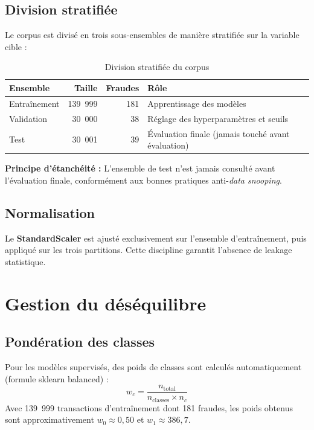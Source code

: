 \documentclass[12pt,a4paper,twoside]{report}
\begin{document}
\subsection{Division stratifiée}

Le corpus est divisé en trois sous-ensembles de manière stratifiée sur la variable cible :

\begin{table}[H]
\centering
\caption{Division stratifiée du corpus}
\label{tab:splits}
\begin{tabular}{lrrl}
\toprule
\textbf{Ensemble} & \textbf{Taille} & \textbf{Fraudes} & \textbf{Rôle} \\
\midrule
Entraînement  & 139~999 & 181 & Apprentissage des modèles \\
Validation    & 30~000  & 38  & Réglage des hyperparamètres et seuils \\
Test          & 30~001  & 39  & Évaluation finale (jamais touché avant évaluation) \\
\bottomrule
\end{tabular}
\end{table}

\textbf{Principe d'étanchéité :} L'ensemble de test n'est jamais consulté avant l'évaluation finale, conformément aux bonnes pratiques anti-\textit{data snooping}.

\subsection{Normalisation}

Le \textbf{StandardScaler} est ajusté exclusivement sur l'ensemble d'entraînement, puis appliqué sur les trois partitions. Cette discipline garantit l'absence de leakage statistique.

\section{Gestion du déséquilibre}

\subsection{Pondération des classes}

Pour les modèles supervisés, des poids de classes sont calculés automatiquement (formule sklearn balanced) :
\[
w_c = \frac{n_{\text{total}}}{n_{\text{classes}} \times n_c}
\]
Avec 139~999 transactions d'entraînement dont 181 fraudes, les poids obtenus sont approximativement $w_0 \approx 0,50$ et $w_1 \approx 386,7$.
\end{document}
